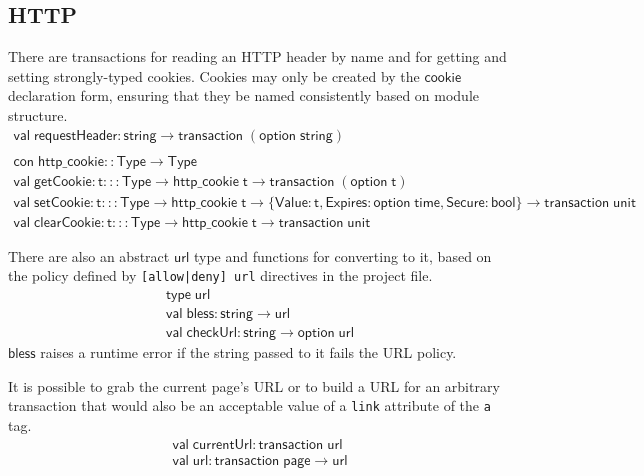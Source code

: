 \documentclass{article}
\newcommand{\mt}[1]{\mathsf{#1}}
\begin{document}
\subsection{HTTP}

There are transactions for reading an HTTP header by name and for getting and setting strongly-typed cookies.  Cookies may only be created by the $\mt{cookie}$ declaration form, ensuring that they be named consistently based on module structure.
$$\begin{array}{l}
  \mt{val} \; \mt{requestHeader} : \mt{string} \to \mt{transaction} \; (\mt{option} \; \mt{string}) \\
  \\
  \mt{con} \; \mt{http\_cookie} :: \mt{Type} \to \mt{Type} \\
  \mt{val} \; \mt{getCookie} : \mt{t} ::: \mt{Type} \to \mt{http\_cookie} \; \mt{t} \to \mt{transaction} \; (\mt{option} \; \mt{t}) \\
  \mt{val} \; \mt{setCookie} : \mt{t} ::: \mt{Type} \to \mt{http\_cookie} \; \mt{t} \to \{\mt{Value} : \mt{t}, \mt{Expires} : \mt{option} \; \mt{time}, \mt{Secure} : \mt{bool}\} \to \mt{transaction} \; \mt{unit} \\
  \mt{val} \; \mt{clearCookie} : \mt{t} ::: \mt{Type} \to \mt{http\_cookie} \; \mt{t} \to \mt{transaction} \; \mt{unit}
\end{array}$$

There are also an abstract $\mt{url}$ type and functions for converting to it, based on the policy defined by \texttt{[allow|deny] url} directives in the project file.
$$\begin{array}{l}
  \mt{type} \; \mt{url} \\
  \mt{val} \; \mt{bless} : \mt{string} \to \mt{url} \\
  \mt{val} \; \mt{checkUrl} : \mt{string} \to \mt{option} \; \mt{url}
\end{array}$$
$\mt{bless}$ raises a runtime error if the string passed to it fails the URL policy.

It is possible to grab the current page's URL or to build a URL for an arbitrary transaction that would also be an acceptable value of a \texttt{link} attribute of the \texttt{a} tag.
$$\begin{array}{l}
  \mt{val} \; \mt{currentUrl} : \mt{transaction} \; \mt{url} \\
  \mt{val} \; \mt{url} : \mt{transaction} \; \mt{page} \to \mt{url}
\end{array}$$
\end{document}
